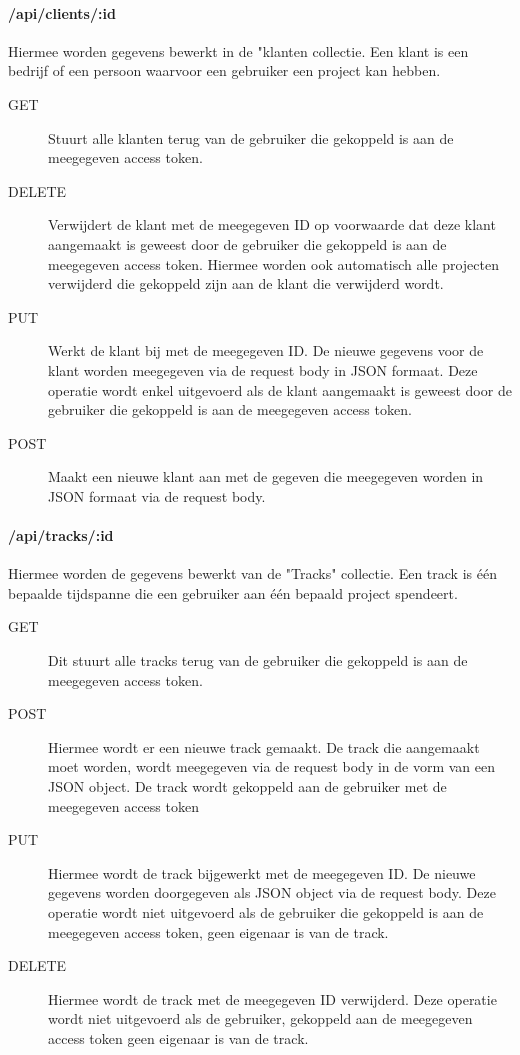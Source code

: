 \documentclass[a4paper,11pt]{article}
\begin{document}
\paragraph{/api/clients/:id}
Hiermee worden gegevens bewerkt in de "klanten collectie. Een klant is een bedrijf of een persoon waarvoor een gebruiker een project kan hebben.
\begin{description}
\item[GET] Stuurt alle klanten terug van de gebruiker die gekoppeld is aan de meegegeven access token.
\item[DELETE] Verwijdert de klant met de meegegeven ID op voorwaarde dat deze klant aangemaakt is geweest door de gebruiker die gekoppeld is aan de meegegeven access token. Hiermee worden ook automatisch alle projecten verwijderd die gekoppeld zijn aan de klant die verwijderd wordt.
\item[PUT] Werkt de klant bij met de meegegeven ID. De nieuwe gegevens voor de klant worden meegegeven via de request body in JSON formaat. Deze operatie wordt enkel uitgevoerd als de klant aangemaakt is geweest door de gebruiker die gekoppeld is aan de meegegeven access token.
\item[POST] Maakt een nieuwe klant aan met de gegeven die meegegeven worden in JSON formaat via de request body.
\end{description}

\paragraph{/api/tracks/:id}
Hiermee worden de gegevens bewerkt van de "Tracks" collectie. Een track is één bepaalde tijdspanne die een gebruiker aan één bepaald project spendeert.
\begin{description}
\item[GET] Dit stuurt alle tracks terug van de gebruiker die gekoppeld is aan de meegegeven access token.
\item[POST] Hiermee wordt er een nieuwe track gemaakt. De track die aangemaakt moet worden, wordt meegegeven via de request body in de vorm van een JSON object. De track wordt gekoppeld aan de gebruiker met de meegegeven access token
\item[PUT] Hiermee wordt de track bijgewerkt met de meegegeven ID. De nieuwe gegevens worden doorgegeven als JSON object via de request body. Deze operatie wordt niet uitgevoerd als de gebruiker die gekoppeld is aan de meegegeven access token, geen eigenaar is van de track.
\item[DELETE] Hiermee wordt de track met de meegegeven ID verwijderd. Deze operatie wordt niet uitgevoerd als de gebruiker, gekoppeld aan de meegegeven access token geen eigenaar is van de track.
\end{description}
\end{document}
